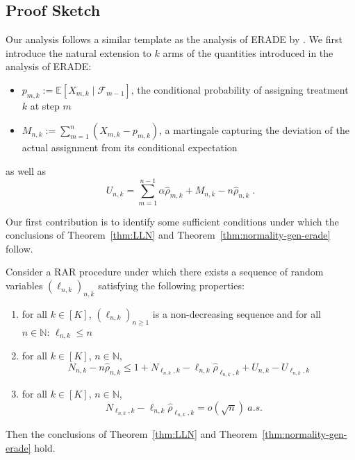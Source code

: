 \subsection{Proof Sketch}\label{sec:rts-proof}
Our analysis follows a similar template as the analysis of ERADE by \cite{hu2009efficient}. We first introduce the natural extension to $k$ arms of the quantities introduced in the analysis of ERADE:
	\begin{itemize}
		\item $p_{m,k} := \mathbb{E}[X_{m,k} \mid \mathcal{F}_{m-1}]$, the conditional probability of assigning treatment $k$ at step $m$
		\item $M_{n,k} := \sum_{m=1}^{n}(X_{m,k} - p_{m,k})$, a martingale capturing the deviation of the actual assignment from its conditional expectation
	\end{itemize}
as well as
\[U_{n,k} = \sum_{m=1}^{n-1} \alpha \hat{\rho}_{m,k} + M_{n,k} - n \hat{\rho}_{n,k}\;.\]

Our first contribution is to identify some sufficient conditions under which the conclusions of Theorem~\ref{thm:LLN} and Theorem~\ref{thm:normality-gen-erade} follow.

\begin{lemma} \label{lem:generic-conditions-main} Consider a RAR procedure under which there exists a sequence of random variables $(\ell_{n,k})_{n,k}$ satisfying the following properties:
\begin{enumerate}[label=(\roman*)]
		\item for all $k\in [K]$, \(\left(\ell_{n,k}\right)_{n \geq 1}\) is a non-decreasing sequence and for all \(n \in \mathbb{N}: \,\ell_{n,k} \leq n\)
		\item for all $k\in [K]$, $n \in \mathbb{N}$,
		\begin{equation}\label{eq:prelim-sketch}
			N_{n,k} - n\hat{\rho}_{n,k} \leq 1+N_{\ell_{n,k},k} - \ell_{n,k} \hat{\rho}_{\ell_{n,k},k} + U_{n,k} - U_{\ell_{n,k},k}
		\end{equation}
		\item for all $k\in [K]$, $n \in \mathbb{N}$,
		\begin{equation}\label{eq:condition-sketch}
			N_{\ell_{n,k},k} - \ell_{n,k} \hat{\rho}_{\ell_{n,k},k} = o(\sqrt{n}) \ a.s.
			\quad
		\end{equation}
	\end{enumerate}
Then the conclusions of Theorem~\ref{thm:LLN} and Theorem~\ref{thm:normality-gen-erade} hold.
\end{lemma}

